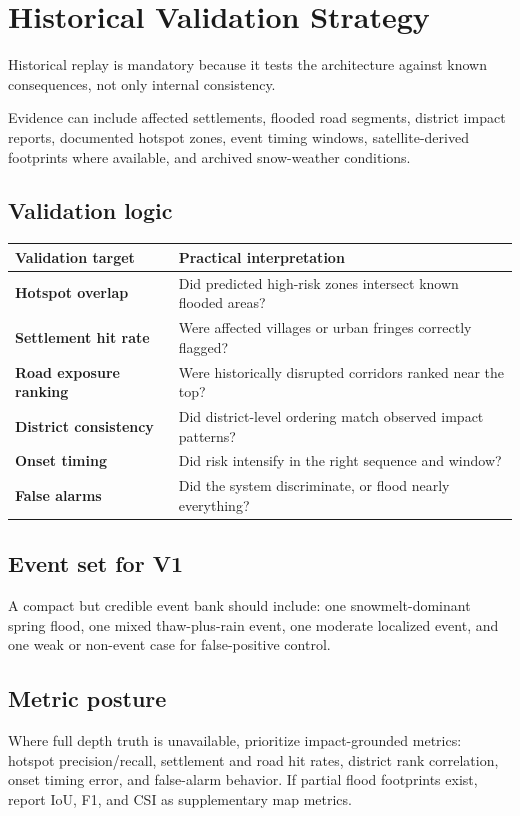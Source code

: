 \documentclass[11pt]{article}
\begin{document}
\section{Historical Validation Strategy}

Historical replay is mandatory because it tests the architecture against known consequences, not only internal consistency.

Evidence can include affected settlements, flooded road segments, district impact reports, documented hotspot zones, event timing windows, satellite-derived footprints where available, and archived snow-weather conditions.

\subsection*{Validation logic}
\begin{tabularx}{\textwidth}{@{}>{\bfseries}p{}Y@{}}
\toprule
Validation target & Practical interpretation \\
\midrule
Hotspot overlap & Did predicted high-risk zones intersect known flooded areas? \\
Settlement hit rate & Were affected villages or urban fringes correctly flagged? \\
Road exposure ranking & Were historically disrupted corridors ranked near the top? \\
District consistency & Did district-level ordering match observed impact patterns? \\
Onset timing & Did risk intensify in the right sequence and window? \\
False alarms & Did the system discriminate, or flood nearly everything? \\
\bottomrule
\end{tabularx}

\subsection*{Event set for V1}
A compact but credible event bank should include: one snowmelt-dominant spring flood, one mixed thaw-plus-rain event, one moderate localized event, and one weak or non-event case for false-positive control.

\subsection*{Metric posture}
Where full depth truth is unavailable, prioritize impact-grounded metrics: hotspot precision/recall, settlement and road hit rates, district rank correlation, onset timing error, and false-alarm behavior. If partial flood footprints exist, report IoU, F1, and CSI as supplementary map metrics.
\end{document}
